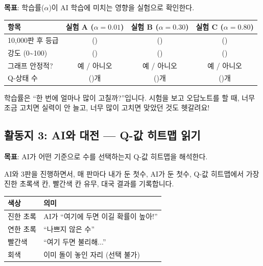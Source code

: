 \documentclass[11pt,a4paper]{article}
\begin{document}
\textbf{목표}: 학습률($\alpha$)이 AI 학습에 미치는 영향을 실험으로 확인한다.

\begin{center}
\renewcommand{\arraystretch}{1.6}
\begin{tabular}{|l|c|c|c|}
\hline
\rowcolor{tableheader}
\textbf{항목} & \textbf{실험 A ($\alpha = 0.01$)} & \textbf{실험 B ($\alpha = 0.30$)} & \textbf{실험 C ($\alpha = 0.80$)} \\
\hline
10,000판 후 등급 & (\hspace{1.5cm}) & (\hspace{1.5cm}) & (\hspace{1.5cm}) \\
\hline
강도 (0\textasciitilde100) & (\hspace{1.5cm}) & (\hspace{1.5cm}) & (\hspace{1.5cm}) \\
\hline
그래프 안정적? & 예 / 아니오 & 예 / 아니오 & 예 / 아니오 \\
\hline
Q-상태 수 & (\hspace{1.5cm})개 & (\hspace{1.5cm})개 & (\hspace{1.5cm})개 \\
\hline
\end{tabular}
\end{center}

\begin{tipbox}
학습률은 ``한 번에 얼마나 많이 고칠까?''입니다. 시험을 보고 오답노트를 할 때, 너무 조금 고치면 실력이 안 늘고, 너무 많이 고치면 맞았던 것도 헷갈려요!
\end{tipbox}

\subsection{활동지 3: AI와 대전 — Q-값 히트맵 읽기}

\textbf{목표}: AI가 어떤 기준으로 수를 선택하는지 Q-값 히트맵을 해석한다.

AI와 3판을 진행하면서, 매 판마다 내가 둔 첫수, AI가 둔 첫수, Q-값 히트맵에서 가장 진한 초록색 칸, 빨간색 칸 유무, 대국 결과를 기록합니다.

\begin{center}
\renewcommand{\arraystretch}{1.4}
\begin{tabular}{|l|l|}
\hline
\rowcolor{tableheader}
\textbf{색상} & \textbf{의미} \\
\hline
진한 초록 & AI가 ``여기에 두면 이길 확률이 높아!'' \\
\hline
연한 초록 & ``나쁘지 않은 수'' \\
\hline
빨간색 & ``여기 두면 불리해...'' \\
\hline
회색 & 이미 돌이 놓인 자리 (선택 불가) \\
\hline
\end{tabular}
\end{center}
\end{document}
